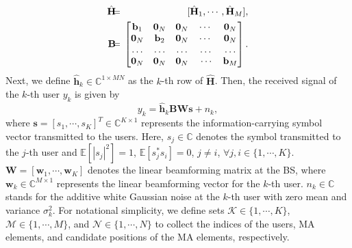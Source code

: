 \documentclass[12pt, draftclsnofoot, onecolumn]{IEEEtran}
\begin{document}
\begin{eqnarray}
\hat{\mathbf{H}}&\hspace*{-2mm}=\hspace*{-2mm}&
[\hat{\mathbf{H}}_{1},\cdots,\hat{\mathbf{H}}_{M}],\\
\mathbf{B}&\hspace*{-2mm}=\hspace*{-2mm}&
  \begin{bmatrix}
    \mathbf{b}_1 & \mathbf{0}_{N} & \mathbf{0}_{N} & \cdots & \mathbf{0}_{N}\\
    \mathbf{0}_{N} & \mathbf{b}_2 & \mathbf{0}_{N} &\cdots & \mathbf{0}_{N}\\
    \ldots & \ldots & \ldots & \ldots & \ldots\\
    \mathbf{0}_{N} & \mathbf{0}_{N} & \mathbf{0}_{N} & \hspace*{1mm}\cdots & \mathbf{b}_M
  \end{bmatrix}.
\end{eqnarray}
Next, we define $\hat{\mathbf{h}}_k\in\mathbb{C}^{1\times MN}$ as the $k$-th row of $\hat{\mathbf{H}}$. Then, the received signal of the $k$-th user $y_k$ is given by
\begin{equation}
    y_k=\hat{\mathbf{h}}_k\mathbf{B}\mathbf{W}\mathbf{s}+n_k,
\end{equation}
where $\mathbf{s}=[s_1,\cdots,s_K]^T\in\mathbb{C}^{K\times 1}$ represents the information-carrying symbol vector transmitted to the users. Here, $s_j\in\mathbb{C}$ denotes the symbol transmitted to the $j$-th user and $\mathbb{E}[|s_j|^2]=1$, $\mathbb{E}[s_j^*s_i]=0$, $j\neq i$, $\forall j,i\in\{1,\cdots,K\}$. $\mathbf{W}=[\mathbf{w}_1,\cdots,\mathbf{w}_K]$ denotes the linear beamforming matrix at the BS, where $\mathbf{w}_k\in \mathbb{C}^{M\times 1}$ represents the linear beamforming vector for the $k$-th user. $n_k\in\mathbb{C}$ stands for the additive white Gaussian noise at the $k$-th user with zero mean and variance $\sigma_k^2$. For notational simplicity, we define sets $\mathcal{K}\in\{1,\cdots,K\}$, $\mathcal{M}\in\{1,\cdots,M\}$, and $\mathcal{N}\in\{1,\cdots,N\}$ to collect the indices of the users, MA elements, and candidate positions of the MA elements, respectively.
\end{document}
